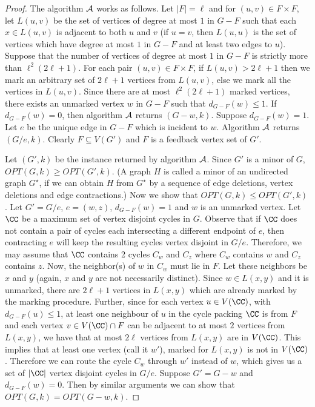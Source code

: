 \begin{proof}
The algorithm ${\cal A}$ works as follows. 
 Let $|F|=\ell$ and  for $(u,v)\in F\times F$, let $L(u,v)$ be the set of vertices of degree at most $1$ in $G-F$ such that each $x\in L(u,v)$ is adjacent to both $u$ and $v$ (if $u=v$, then $L(u,u)$
is the set of vertices which have degree at most $1$ in $G-F$ and at least two edges to $u$). Suppose that the number of vertices of degree at most $1$ in $G-F$ is strictly more than
$\ell^2(2\ell+1)$. For each pair $(u,v)\in F\times F$, if $L(u,v)>2\ell+1$ then we mark an arbitrary  set of 
$2\ell+1$ vertices from $L(u,v)$, else we mark all the vertices in $L(u,v)$. Since there are at most $\ell^2(2\ell+1)$ marked vertices,
there exists an unmarked vertex $w$ in $G-F$ such that 
 $d_{G-F}(w)\leq 1$. 
If $d_{G-F}(w)=0$, then algorithm ${\cal A}$
returns $(G-w,k)$.
Suppose $d_{G-F}(w)=1$. Let  $e$ be the unique edge in $G-F$ which is incident to $w$. Algorithm ${\cal A}$  
returns $(G/e,k)$. Clearly $F\subseteq V(G')$ and $F$ is a feedback vertex set of $G'$. 

 Let $(G',k)$ be the instance returned by algorithm ${\cal A}$.
Since $G'$ is a minor of $G$, $OPT(G,k)\geq OPT(G',k)$.   (A graph $H$ is called a minor of an undirected  graph $G^\star$, if we  can obtain $H$ from $G^\star$ by a sequence of edge deletions, vertex deletions and edge contractions.) 
Now we show that $OPT(G,k)\leq OPT(G',k)$. 
Let $G'=G/e$, $e=(w,z)$, $d_{G-F}(w)=1$ and $w$ is an unmarked vertex.   
 Let $\CC$ be a maximum set of vertex disjoint cycles in $G$. Observe that if $\CC$ does not contain a pair of cycles each intersecting a different endpoint of $e$, then contracting $e$ will keep the resulting cycles vertex disjoint in $G/e$. Therefore, we may assume that $\CC$ contains 2 cycles $C_w$ and $C_z$ where $C_w$ contains $w$ and $C_z$ contains $z$. Now, the neighbor(s) of $w$ in $C_w$ must lie in $F$. Let these neighbors be $x$ and $y$ (again, $x$ and $y$ are not necessarily distinct). Since $w\in L(x,y)$ and it is unmarked, there are $2\ell+1$ vertices in $L(x,y)$ which are already marked by the marking procedure. 
Further, since for each vertex $u\in V(\CC)$, with $d_{G-F}(u)\leq 1$, 
at least one neighbour of $u$ in the cycle packing $\CC$ is from $F$  and each  
vertex  $v\in V(\CC)\cap F$ can be adjacent to at most $2$ vertices from 
$L(x,y)$, we have that at most $2\ell$ vertices from $L(x,y)$ are in $V(\CC)$. This implies that 
at least one vertex (call it $w'$), marked for $L(x,y)$ is not in   $V(\CC)$. 
Therefore we can route the cycle $C_w$ through $w'$ instead of $w$, which gives us a set of $\vert \CC\vert$ vertex disjoint cycles in $G/e$. 
Suppose $G'=G-w$ and $d_{G-F}(w)=0$. Then by similar arguments we can show that 
$OPT(G,k)=OPT(G-w,k)$. 


\end{proof}
